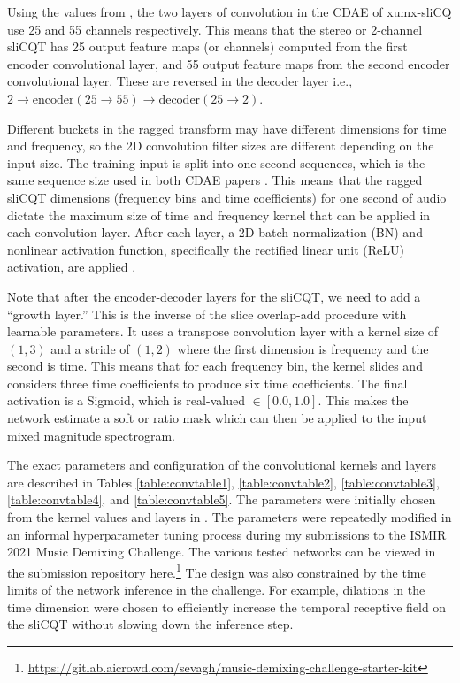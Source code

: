 \documentclass[report.tex]{subfiles}
\begin{document}
Using the values from \textcite{plumbley2}, the two layers of convolution in the CDAE of xumx-sliCQ use 25 and 55 channels respectively. This means that the stereo or 2-channel sliCQT has 25 output feature maps (or channels) computed from the first encoder convolutional layer, and 55 output feature maps from the second encoder convolutional layer. These are reversed in the decoder layer i.e., $2 \rightarrow \text{encoder}(25 \rightarrow 55) \rightarrow \text{decoder}(25 \rightarrow 2)$.

Different buckets in the ragged transform may have different dimensions for time and frequency, so the 2D convolution filter sizes are different depending on the input size. The training input is split into one second sequences, which is the same sequence size used in both CDAE papers \parencite{plumbley1, plumbley2}. This means that the ragged sliCQT dimensions (frequency bins and time coefficients) for one second of audio dictate the maximum size of time and frequency kernel that can be applied in each convolution layer. After each layer, a 2D batch normalization (BN) and nonlinear activation function, specifically the rectified linear unit (ReLU) activation, are applied \parencite{plumbley2}.

Note that after the encoder-decoder layers for the sliCQT, we need to add a ``growth layer.'' This is the inverse of the slice overlap-add procedure with learnable parameters. It uses a transpose convolution layer with a kernel size of $(1, 3)$ and a stride of $(1, 2)$ where the first dimension is frequency and the second is time. This means that for each frequency bin, the kernel slides and considers three time coefficients to produce six time coefficients. The final activation is a Sigmoid, which is real-valued $\in [0.0, 1.0]$. This makes the network estimate a soft or ratio mask which can then be applied to the input mixed magnitude spectrogram.

The exact parameters and configuration of the convolutional kernels and layers are described in Tables \ref{table:convtable1}, \ref{table:convtable2}, \ref{table:convtable3}, \ref{table:convtable4}, and \ref{table:convtable5}. The parameters were initially chosen from the kernel values and layers in \textcite{plumbley1, plumbley2}. The parameters were repeatedly modified in an informal hyperparameter tuning process during my submissions to the ISMIR 2021 Music Demixing Challenge. The various tested networks can be viewed in the submission repository here.\footnote{\url{https://gitlab.aicrowd.com/sevagh/music-demixing-challenge-starter-kit}} The design was also constrained by the time limits of the network inference in the challenge. For example, dilations in the time dimension were chosen to efficiently increase the temporal receptive field on the sliCQT without slowing down the inference step.
\end{document}
